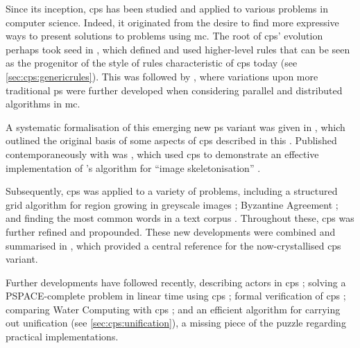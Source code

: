 Since its inception, \gls{cps} has been studied and applied to various problems in computer science.  Indeed, it originated from the desire to find more expressive ways to present solutions to problems using \gls{mc}.  The root of \gls{cps}' evolution perhaps took seed in \cite{Balanescu2011}, which defined and used higher-level rules that can be seen as the progenitor of the style of rules characteristic of \gls{cps} today (see \vref{sec:cps:genericrules}).  This was followed by \cite{Nicolescu2012}, where variations upon more traditional \gls{ps} were further developed when considering parallel and distributed algorithms in \gls{mc}.

A systematic formalisation of this emerging new \gls{ps} variant was given in \cite{Nicolescu2014a}, which outlined the original basis of some aspects of \gls{cps} described in this .  Published contemporaneously with \cite{Nicolescu2014a} was \cite{Nicolescu2014}, which used \gls{cps} to demonstrate an effective implementation of \citeauthor{Guo1989}'s algorithm for ``image skeletonisation'' \cite{Guo1989}.

Subsequently, \gls{cps} was applied to a variety of problems, including a structured grid algorithm for region growing in greyscale images \cite{Nicolescu2015}; Byzantine Agreement \cite{Nicolescu2017}; and finding the most common words in a text corpus \cite{Nicolescu2018a}.  Throughout these, \gls{cps} was further refined and propounded.  These new developments were combined and summarised in \cite{Nicolescu2018}, which provided a central reference for the now-crystallised \gls{cps} variant.

Further developments have followed recently, describing \glspl{actor} in \gls{cps} \cite{Henderson2019};  solving a PSPACE-complete problem in linear time using \gls{cps} \cite{Henderson2020}; formal verification of \gls{cps} \cite{Liu2020,Liu2021a}; comparing Water Computing with \gls{cps} \cite{Henderson2021}; and an efficient algorithm for carrying out unification \cite{Liu2021} (see \cref{sec:cps:unification}), a missing piece of the puzzle regarding practical implementations.

